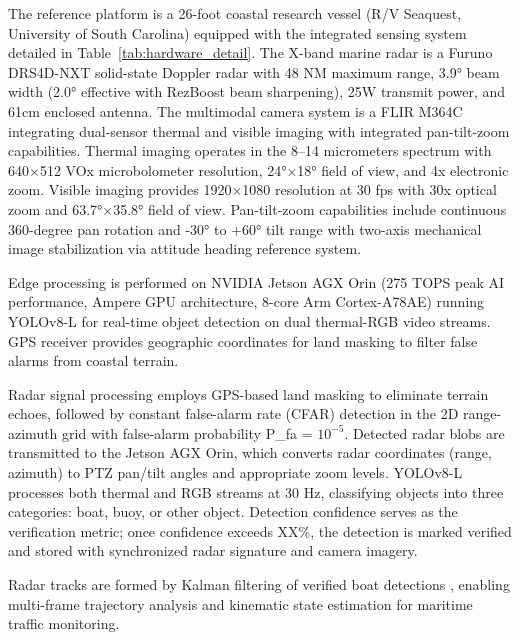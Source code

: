 \documentclass[twocolumn, 10pt]{article}
\begin{document}
The reference platform is a 26-foot coastal research vessel (R/V Seaquest, University of South Carolina) equipped with the integrated sensing system detailed in Table~\ref{tab:hardware_detail}. The X-band marine radar is a Furuno DRS4D-NXT solid-state Doppler radar with 48 NM maximum range, 3.9° beam width (2.0° effective with RezBoost beam sharpening), 25W transmit power, and 61cm enclosed antenna. The multimodal camera system is a FLIR M364C integrating dual-sensor thermal and visible imaging with integrated pan-tilt-zoom capabilities. Thermal imaging operates in the 8--14 micrometers spectrum with 640×512 VOx microbolometer resolution, 24°×18° field of view, and 4x electronic zoom. Visible imaging provides 1920×1080 resolution at 30 fps with 30x optical zoom and 63.7°×35.8° field of view. Pan-tilt-zoom capabilities include continuous 360-degree pan rotation and -30° to +60° tilt range with two-axis mechanical image stabilization via attitude heading reference system.

Edge processing is performed on NVIDIA Jetson AGX Orin (275 TOPS peak AI performance, Ampere GPU architecture, 8-core Arm Cortex-A78AE) running YOLOv8-L for real-time object detection on dual thermal-RGB video streams. GPS receiver provides geographic coordinates for land masking to filter false alarms from coastal terrain.

Radar signal processing employs GPS-based land masking to eliminate terrain echoes, followed by constant false-alarm rate (CFAR) detection in the 2D range-azimuth grid with false-alarm probability P_fa = $10^{-5}$. Detected radar blobs are transmitted to the Jetson AGX Orin, which converts radar coordinates (range, azimuth) to PTZ pan/tilt angles and appropriate zoom levels. YOLOv8-L processes both thermal and RGB streams at 30 Hz, classifying objects into three categories: boat, buoy, or other object. Detection confidence serves as the verification metric; once confidence exceeds XX\%, the detection is marked verified and stored with synchronized radar signature and camera imagery.

Radar tracks are formed by Kalman filtering of verified boat detections \cite{Welch1995Kalman}, enabling multi-frame trajectory analysis and kinematic state estimation for maritime traffic monitoring.
\end{document}
